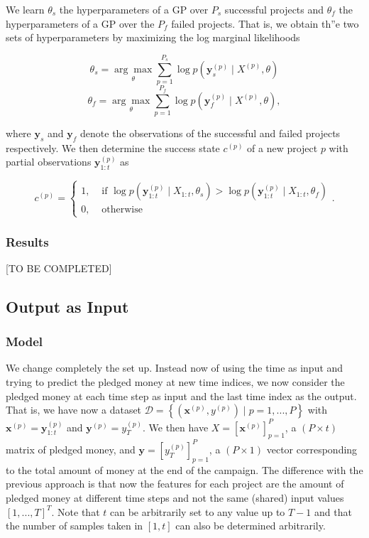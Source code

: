 \documentclass[11pt, oneside]{article}   	%
\begin{document}
			We learn $\theta_s$ the hyperparameters of a GP over $P_s$ successful projects  and $\theta_f$ the hyperparameters of a GP over the $P_f$ failed projects. That is, we obtain th''e two sets of hyperparameters by maximizing the log marginal likelihoods
        
                        \[\theta_s = \underset{\theta} {\arg\max} \sum_{p=1}^{P_s} \log p(\mathbf{y}_s^{(p)} \mid X^{(p)}, \theta)\]
                        \[\theta_f = \underset{\theta} {\arg\max} \sum_{p=1}^{P_f} \log p(\mathbf{y}_f^{(p)} \mid X^{(p)}, \theta),\]
                        
                        where $\mathbf{y}_s$ and $\mathbf{y}_f$ denote the observations of the successful and failed projects respectively. We then determine the success state $c^{(p)}$ of a new project $p$ with partial observations $\mathbf{y}_{1:t}^{(p)}$ as
                        
                        \[c^{(p)} = 
                        \begin{cases}
                            1, & \text{ if } \log p(\mathbf{y}_{1:t}^{(p)} \mid X_{1:t}, \theta_s) > \log p(\mathbf{y}_{1:t}^{(p)} \mid X_{1:t}, \theta_f) \\
                            0, & \text{ otherwise }
                        \end{cases}.\]
            
         	\subsubsection*{Results}
		[TO BE COMPLETED]
        
         \subsection{Output as Input}
         	\subsubsection*{Model}
        			We change completely the set up. Instead now of using the time as input and trying to predict the pledged money at new time indices, we now consider the pledged money at each time step as input and the last time index as the output. That is, we have now a dataset $\mathcal{D} = \left\{ (\mathbf{x}^{(p)}, y^{(p)}) \mid p = 1, ..., P \right\}$ with $\mathbf{x}^{(p)} = \mathbf{y}_{1:t}^{(p)}$ and $\mathbf{y}^{(p)} = y_T^{(p)}$. We then have $X = \left[\mathbf{x}^{(p)}\right]_{p=1}^P$, a $(P \times t)$ matrix of pledged money, and $\mathbf{y} = \left[y_T^{(p)}\right]_{p=1}^P$, a $(P \times 1)$ vector corresponding to the total amount of money at the end of the campaign. The difference with the previous approach is that now the features for each project are the amount of pledged money at different time steps and not the same (shared) input values $[1,...,T]^T$. Note that $t$ can be arbitrarily set to any value up to $T-1$ and that the number of samples taken in $[1, t]$ can also be determined arbitrarily.
        
\end{document}
